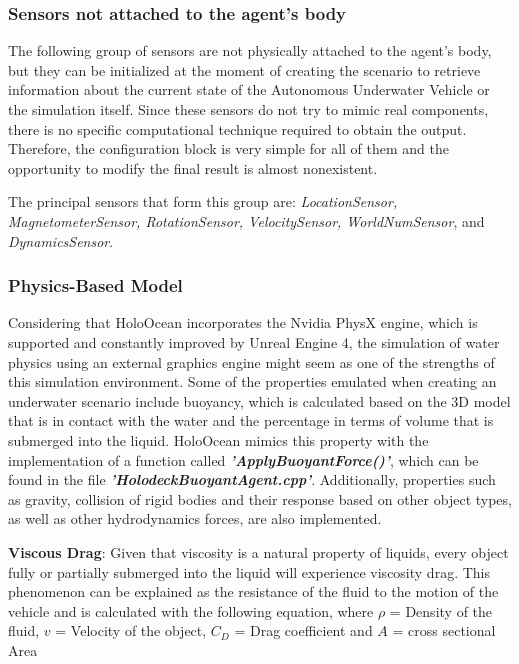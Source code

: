 \documentclass[]{article}
\begin{document}
	\subsubsection{Sensors not attached to the agent's body}
	
	The following group of sensors are not physically attached to the agent's body, but they can be initialized at the moment of creating the scenario to retrieve information about the current state of the Autonomous Underwater Vehicle or the simulation itself. Since these sensors do not try to mimic real components, there is no specific computational technique required to obtain the output. Therefore, the configuration block is very simple for all of them and the opportunity to modify the final result is almost nonexistent.
	
	The principal sensors that form this group are: \textit{LocationSensor, MagnetometerSensor, RotationSensor, VelocitySensor, WorldNumSensor}, and \textit{DynamicsSensor}.
	
	\subsubsection{Physics-Based Model}
	
	Considering that HoloOcean incorporates the Nvidia PhysX engine, which is supported and constantly improved by Unreal Engine 4, the simulation of water physics using an external graphics engine might seem as one of the strengths of this simulation environment. Some of the properties emulated when creating an underwater scenario include buoyancy, which is calculated based on the 3D model that is in contact with the water and the percentage in terms of volume that is submerged into the liquid. HoloOcean mimics this property with the implementation of a function called \textbf{\textit{'ApplyBuoyantForce()'}}, which can be found in the file \textbf{\textit{'HolodeckBuoyantAgent.cpp'}}. Additionally, properties such as gravity, collision of rigid bodies and their response based on other object types, as well as other hydrodynamics forces, are also implemented.
	
	\textbf{Viscous Drag}: Given that viscosity is a natural property of liquids, every object fully or partially submerged into the liquid will experience viscosity drag. This phenomenon can be explained as the resistance of the fluid to the motion of the vehicle and is calculated with the following equation, where $\rho$ = Density of the fluid, $v$ = Velocity of the object, $C_{D}$ = Drag coefficient and $A$ = cross sectional Area
	
\end{document}
